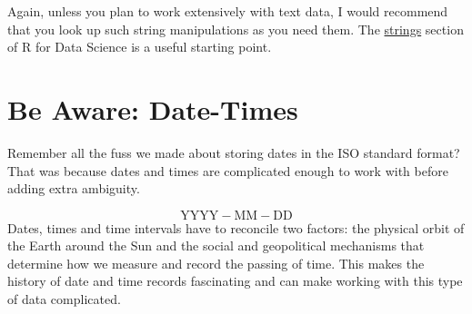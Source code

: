 \documentclass[
  12pt,
]{book}
\newenvironment{Shaded}{\begin{snugshade}}{\end{snugshade}}
\newcommand{\AttributeTok}[1]{\textcolor[rgb]{0.77,0.63,0.00}{#1}}
\newcommand{\CommentTok}[1]{\textcolor[rgb]{0.56,0.35,0.01}{\textit{#1}}}
\newcommand{\ControlFlowTok}[1]{\textcolor[rgb]{0.13,0.29,0.53}{\textbf{#1}}}
\newcommand{\DecValTok}[1]{\textcolor[rgb]{0.00,0.00,0.81}{#1}}
\newcommand{\FunctionTok}[1]{\textcolor[rgb]{0.00,0.00,0.00}{#1}}
\newcommand{\NormalTok}[1]{#1}
\newcommand{\OtherTok}[1]{\textcolor[rgb]{0.56,0.35,0.01}{#1}}
\newcommand{\SpecialCharTok}[1]{\textcolor[rgb]{0.00,0.00,0.00}{#1}}
\newcommand{\StringTok}[1]{\textcolor[rgb]{0.31,0.60,0.02}{#1}}
\begin{document}
\begin{Shaded}
\end{Shaded}

Again, unless you plan to work extensively with text data, I would recommend that you look up such string manipulations as you need them. The \href{https://r4ds.had.co.nz/strings.html\#strings}{strings} section of R for Data Science is a useful starting point.

\hypertarget{be-aware-date-times}{%
\section{Be Aware: Date-Times}\label{be-aware-date-times}}

Remember all the fuss we made about storing dates in the ISO standard format? That was because dates and times are complicated enough to work with before adding extra ambiguity.

\[ \text{YYYY} - \text{MM} - \text{DD}\]
Dates, times and time intervals have to reconcile two factors: the physical orbit of the Earth around the Sun and the social and geopolitical mechanisms that determine how we measure and record the passing of time. This makes the history of date and time records fascinating and can make working with this type of data complicated.
\end{document}
